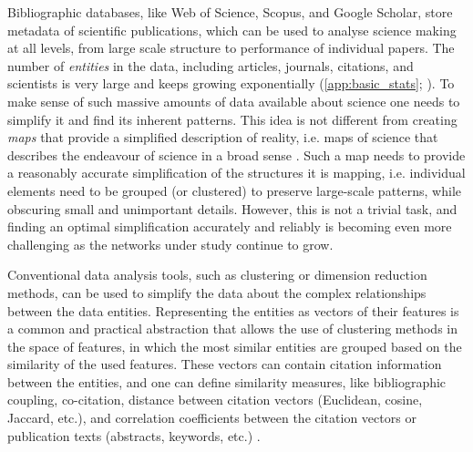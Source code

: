 \documentclass[a4paper,12pt]{article}
\begin{document}
Bibliographic databases, like Web of Science, Scopus, and Google Scholar, store metadata of scientific publications,
which can be used to analyse science making at all levels, from large scale structure to performance of individual papers.
The number of \emph{entities} in the data, including articles, journals, citations, and scientists is very large and keeps growing exponentially (\cref{app:basic_stats}; \citealt{Pan2016arXiv}). To make sense of such massive amounts of data available about science one needs to simplify it and find its inherent patterns. This idea is not different from creating \emph{maps} that provide a simplified description of reality, i.e. maps of science that describes the endeavour of science in a broad sense \citep{Small1999,Boyack2005,Chen2013}. Such a map needs to provide a reasonably accurate simplification of the  structures it is mapping, i.e. individual elements need to be grouped (or clustered) to preserve large-scale patterns, while obscuring small and unimportant details. 
However, this is not a trivial task, and finding an optimal simplification accurately and reliably is becoming even more challenging 
as the networks under study continue to grow.

Conventional data analysis tools, such as clustering or dimension reduction methods, can be used to simplify 
the data about the complex relationships between the data entities. Representing the entities as vectors of their features is a common and practical abstraction that allows the use of clustering methods in the space of features, in which the most similar entities are grouped based on the similarity of the used features.
These vectors can contain citation information between the entities, and one can define similarity measures, like bibliographic coupling, co-citation, distance between citation vectors (Euclidean, cosine, 
Jaccard, etc.), and correlation coefficients between the citation vectors or publication texts (abstracts, keywords, etc.)
\citep{Kessler1963,Small1973,Marshakova1973,Carpenter1973,Leydesdorff2012,Boyack2005,Janssens2009}.
\end{document}
